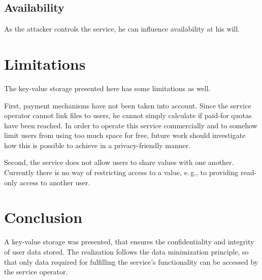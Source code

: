 \subsection{Availability}
As the attacker controls the service, he can influence availability at his will.

\section{Limitations}
The key-value storage presented here has some limitations as well.

First, payment mechanisms have not been taken into account.
Since the service operator cannot link files to users, he cannot simply calculate if paid-for quotas have been reached.
In order to operate this service commercially and to somehow limit users from using too much space for free, future work should investigate how this is possible to achieve in a privacy-friendly manner.

Second, the service does not allow users to share values with one another.
Currently there is no way of restricting access to a value, e.\,g., to providing read-only access to another user.

\section{Conclusion}
A key-value storage was presented, that ensures the confidentiality and integrity of user data stored.
The realization follows the data minimization principle, so that only data required for fulfilling the service's functionality can be accessed by the service operator.
